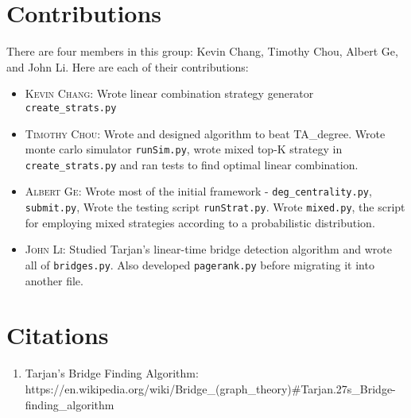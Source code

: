 \documentclass{article}
\begin{document}
\section{Contributions}
There are four members in this group: Kevin Chang, Timothy Chou, Albert Ge, and John Li. Here are each of their contributions:
\begin{itemize}
  \item \textsc{Kevin Chang}: Wrote linear combination strategy generator \texttt{create\_strats.py}
  \item \textsc{Timothy Chou}: Wrote and designed algorithm to beat TA\_degree. Wrote monte carlo simulator \texttt{runSim.py}, wrote mixed top-K strategy in \texttt{create\_strats.py} and ran tests to find optimal linear combination.
    \item \textsc{Albert Ge}: Wrote most of the initial framework - \texttt{deg\_centrality.py}, \texttt{submit.py}, 
  Wrote the testing script \texttt{runStrat.py}. 
  Wrote \texttt{mixed.py}, the script for employing mixed strategies according to
  a probabilistic distribution.
  \item \textsc{John Li}: Studied Tarjan's linear-time bridge detection algorithm and wrote all of \texttt{bridges.py}. Also developed \texttt{pagerank.py} before migrating it into another file. 
 \end{itemize}

\section{Citations}
\begin{enumerate}
  \item Tarjan's Bridge Finding Algorithm: \\
  https://en.wikipedia.org/wiki/Bridge\_(graph\_theory)\#Tarjan.27s\_Bridge-finding\_algorithm
\end{enumerate}


\end{document}
